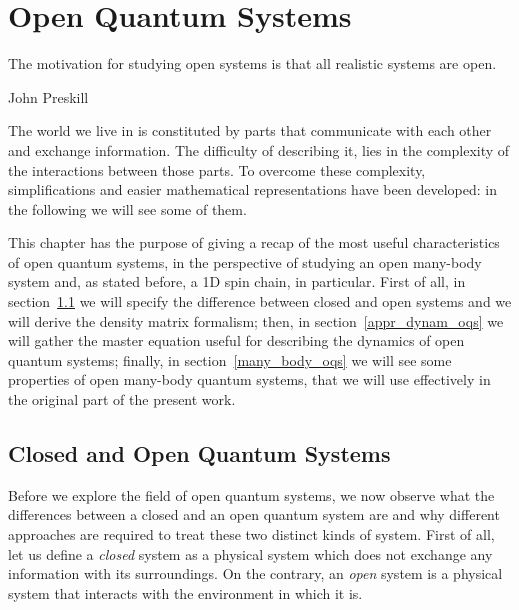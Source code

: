 \chapter{Open Quantum Systems}
\label{Chapter1}
\epigraph{The motivation for studying open systems is that all realistic systems are open.}{John Preskill}

\newcommand{\keyword}[1]{\textbf{#1}}
\newcommand{\tabhead}[1]{\textbf{#1}}
\newcommand{\code}[1]{\texttt{#1}}
\newcommand{\file}[1]{\texttt{\bfseries#1}}
\newcommand{\option}[1]{\texttt{\itshape#1}}

The world we live in is constituted by parts that communicate with each other and exchange information. The difficulty of describing it, lies in the complexity of the interactions between those parts. To overcome these complexity, simplifications and easier mathematical representations have been developed: in the following we will see some of them.

This chapter has the purpose of giving a recap of the most useful characteristics of open quantum systems, in the perspective of studying an open many-body system and, as stated before, a 1D spin chain, in particular. First of all, in section~\ref{cl_open_qs} we will specify the difference between closed and open systems and we will derive the density matrix formalism; then, in section~\ref{appr_dynam_oqs} we will gather the master equation useful for describing the dynamics of open quantum systems; finally, in section~\ref{many_body_oqs} we will see some properties of open many-body quantum systems, that we will use effectively in the original part of the present work.

\section{Closed and Open Quantum Systems}
\label{cl_open_qs}
Before we explore the field of open quantum systems, we now observe what the differences between a closed and an open quantum system are and why different approaches are required to treat these two distinct kinds of system. First of all, let us define a \emph{closed} system as a physical system which does not exchange any information with its surroundings. On the contrary, an \emph{open} system is a physical system that interacts with the environment in which it is. 


